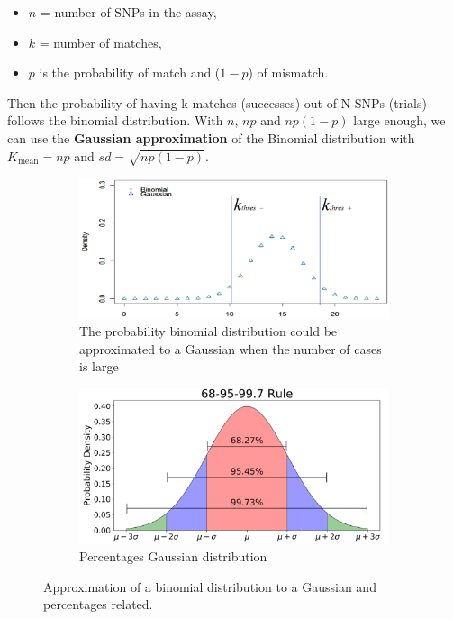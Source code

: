 \begin{itemize}
	\item $n$ = number of SNPs in the assay, 
	\item $k$ = number of matches, 
	\item $p$ is the probability of match and ($1-p$) of mismatch.
\end{itemize}

Then the probability of having k matches (successes) out of N SNPs (trials)
follows the binomial distribution. With $n$, $np$ and $np(1-p)$ large enough, we
can use the \textbf{Gaussian approximation} of the Binomial distribution with
$K_{\text{mean}} = np$ and $sd = \sqrt{np(1-p)}$. \\


\begin{figure}[ht]
	\centering
	\begin{subfigure}[t]{0.80\textwidth}
		\centering
		\includegraphics[width=1\textwidth]{binomialDistSNPsmatches.PNG}
		\caption{The probability binomial distribution could be approximated to a Gaussian when the number of cases is large}
	\end{subfigure}
	\hfill
	\begin{subfigure}[t]{0.80\textwidth}
		\centering
		\includegraphics[width=1\textwidth]{gaussianity-binomialdist.PNG}
		\caption{Percentages Gaussian distribution}
	\end{subfigure}
	\caption{Approximation of a binomial distribution to a Gaussian and
	percentages related.}
	\label{fig: binomial distribution SNP matches}
\end{figure}

